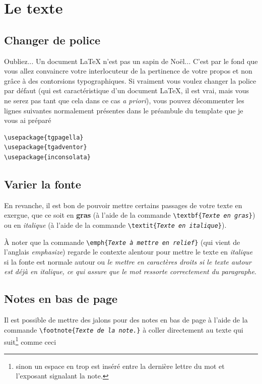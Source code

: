 \documentclass[12pt,a4paper]{article}
\newenvironment{code}{%
\begin{mdframed}[linecolor=Green,innerrightmargin=30pt,innerleftmargin=30pt,
backgroundcolor=Black!5,
skipabove=10pt,skipbelow=10pt,roundcorner=5pt,
splitbottomskip=6pt,splittopskip=12pt]
}{%
\end{mdframed}
}
\newcommand{\cmd}[1]{\texttt{\textbackslash#1}}
\newcommand{\cmdone}[2]{\cmd{#1\{\emph{#2}\}}}
\begin{document}
\section{Le texte}

\subsection{Changer de police}

Oubliez... Un document \LaTeX{} n'est pas un sapin de Noël... C'est par le fond que vous allez convaincre votre interlocuteur de la pertinence de votre propos et non grâce à des contorsions typographiques. Si vraiment vous voulez changer la police par défaut (qui est caractéristique d'un document \LaTeX, il est vrai, mais vous ne serez pas tant que cela dans ce cas \emph{a priori}), vous pouvez décommenter les lignes suivantes normalement présentes dans le préambule du template que je vous ai préparé

\begin{code}
\begin{verbatim}
\usepackage{tgpagella}
\usepackage{tgadventor}
\usepackage{inconsolata}
\end{verbatim}
\end{code}

\subsection{Varier la fonte}

En revanche, il est bon de pouvoir mettre certains passages de votre texte en exergue, que ce soit en \textbf{gras} (à l'aide de la commande \cmdone{textbf}{Texte en gras}) ou en \textit{italique} (à l'aide de la commande \cmdone{textit}{Texte en italique}).

À noter que la commande \cmdone{emph}{Texte à mettre en relief} (qui vient de l'anglais \emph{emphasize}) regarde le contexte alentour pour mettre le texte en \emph{italique} si la fonte est normale autour ou \textit{le mettre en caractères \emph{droits} si le texte autour est déjà en italique, ce qui assure que le mot ressorte correctement du paragraphe}.

\subsection{Notes en bas de page}

Il est possible de mettre des jalons pour des notes en bas de page à l'aide de la commande \cmdone{footnote}{Texte de la note.} à coller directement au texte qui suit\footnote{sinon un espace en trop est inséré entre la dernière lettre du mot et l'exposant signalant la note.} comme ceci
\end{document}
